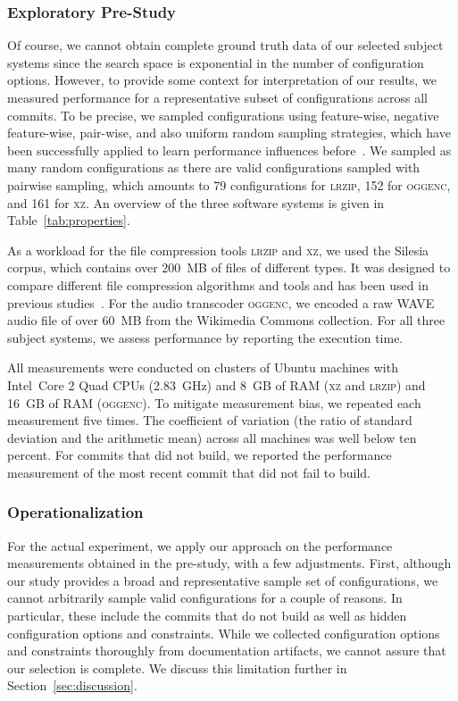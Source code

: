 \documentclass[sigconf, screen]{acmart}
\begin{document}
	\subsubsection{Exploratory Pre-Study}
	Of course, we cannot obtain complete ground truth data of our selected subject systems since the search space is exponential in the number of configuration options. 
	However, to provide some context for interpretation of our results, we measured performance for a representative subset of configurations across all commits. To be precise, we sampled configurations using feature-wise, negative feature-wise, pair-wise, and also uniform random sampling strategies, which have been successfully applied to learn performance influences before~\cite{alves_sampling_2020}. We sampled as many random configurations as there are valid configurations sampled with pairwise sampling, which amounts to 79 configurations for \textsc{lrzip}, 152 for \textsc{oggenc}, and 161 for \textsc{xz}. An overview of the three software systems is given in Table~\ref{tab:properties}.
	
	As a workload for the file compression tools \textsc{lrzip} and \textsc{xz}, we used the Silesia corpus, which contains over 200~MB of files of different types. It was designed to compare different file compression algorithms and tools and has been used in previous studies~\cite{muhlbauer_accurate_2019}. For the audio transcoder \textsc{oggenc}, we encoded a raw WAVE audio file of over 60~MB from the Wikimedia Commons collection. For all three subject systems, we assess performance by reporting the execution time.
	
	All measurements were conducted on clusters of Ubuntu machines with Intel~Core
	2 Quad CPUs (2.83~GHz) and 8~GB of RAM (\textsc{xz} and \textsc{lrzip}) and 16~GB of RAM (\textsc{oggenc}). To mitigate measurement bias, we repeated each measurement five times. The coefficient of variation (the ratio of standard deviation and the arithmetic mean) across all machines was well below ten percent. For commits that did not build, we reported the performance measurement of the most recent commit that did not fail to build.
	
	\subsubsection{Operationalization}\label{sec:rq2_operationalization}
	For the actual experiment, we apply our approach on the performance measurements obtained in the pre-study, with a few adjustments.
	First, although our study provides a broad and representative sample set of configurations, we cannot arbitrarily sample valid configurations for a couple of reasons. In particular, these include the commits that do not build as well as hidden configuration options and constraints. While we collected configuration options and constraints thoroughly from documentation artifacts, we cannot assure that our selection is complete. We discuss this limitation further in Section~\ref{sec:discussion}.
	
\end{document}
